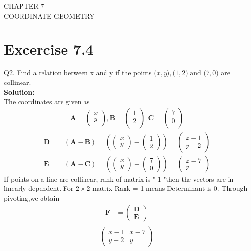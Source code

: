 \documentclass[12pt]{article}
\providecommand{\brak}[1]{\ensuremath{\left(#1\right)}}
\newcommand{\solution}{\noindent \textbf{Solution: }}
\newcommand{\myvec}[1]{\ensuremath{\begin{pmatrix}#1\end{pmatrix}}}
\let\vec\mathbf
\begin{document}
\begin{center}
\textbf\large{CHAPTER-7 \\ COORDINATE GEOMETRY}
\end{center}
\section*{Excercise 7.4}

Q2. Find a relation between x and y if the points $\vec(x, y), \vec(1, 2) \text{ and } \vec(7, 0)$ are collinear.
\\
\solution
\\
The coordinates are given as
	\begin{align}
	\vec{A} = \myvec{
		x\\
		y\\
		},
	\vec{B} = \myvec{
		1\\
		2\\
		},
	\vec{C} = \myvec{
		7\\
		0\\
		}
	\end{align}
	\begin{align}
\vec{D} &=\brak{\vec{A}-\vec{B}} = \brak{\myvec{x \\y } - \myvec{1 \\2 } } = \myvec{x-1 \\ y-2 }\\
\vec{E} &= \brak{\vec{A}-\vec{C}} = \brak{\myvec{x \\ y } - \myvec{7 \\0} } = \myvec{x-7 \\y}
\end{align}
 If points on a line  are  collinear, rank of matrix is " 1 "then the vectors are in linearly dependent.
For $2\times2$ matrix Rank = 1 means Determinant is 0.
Through pivoting,we obtain
\begin{align}
\vec{F} &={\myvec{\vec{D}\\ \vec{E}}}
\end{align}
\begin{align}
\begin{split}
\myvec{
x-1 & x-7
 \\
y-2 & y 
}
\end{split}
\end{align}
\end{document}
